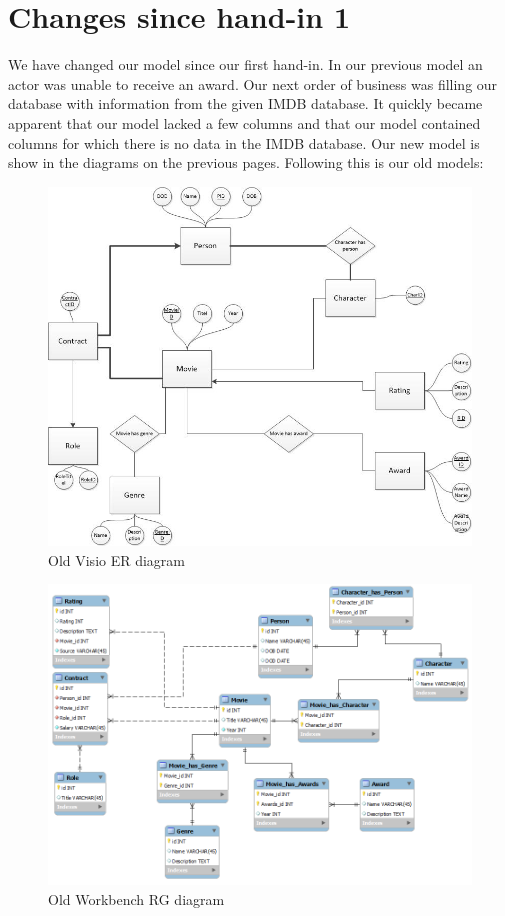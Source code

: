 \section{Changes since hand-in 1}
We have changed our model since our first hand-in. In our previous model an actor was unable to receive an award.
Our next order of business was filling our database with information from the given IMDB database. It quickly became apparent that our model lacked a few columns and that our model contained columns for which there is no data in the IMDB database.
Our new model is show in the diagrams on the previous pages. Following this is our old models:
\begin{figure}[h!]
\includegraphics[width=\textwidth,natwidth=825,natheight=699]{illustrations/OldER.jpg}
  \caption{Old Visio ER diagram}
\end{figure}
\begin{figure}[h!]
\includegraphics[width=\textwidth,natwidth=940,natheight=670]{illustrations/OldRG.png}
  \caption{Old Workbench RG diagram}
\end{figure}
\newpage
